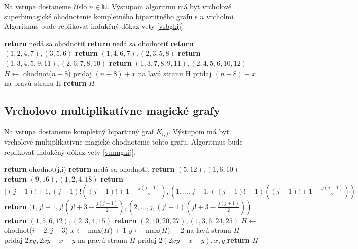 \begin{alg}
\label{algvsbgkij}
Na vstupe dostaneme číslo $n \in \mathbb{N}$. Výstupom algoritmu má byť vrcholové superbimagické ohodnotenie kompletného bipartitného grafu s $n$ vrcholmi. Algoritmus bude replikovať indukčný dôkaz vety \ref{vsbgkij}.
\end{alg}

\begin{algorithmic}
	\STATE \textbf{return} nedá sa ohodnotiť
\ENDIF
{}
	\STATE \textbf{return} nedá sa ohodnotiť
\ENDIF
{}
	\STATE \textbf{return} $(1, 2, 4, 7), (3, 5, 6)$
\ENDIF
{}
	\STATE \textbf{return} $(1, 4, 6, 7), (2, 3, 5, 8)$
\ENDIF
{}
	\STATE \textbf{return} $(1, 3, 4, 5, 9, 11), (2, 6, 7, 8, 10)$
\ENDIF
{}
	\STATE \textbf{return} $(1, 3, 7, 8, 9, 11), (2, 4, 5, 6, 10, 12)$
\ENDIF
\STATE $H \gets$ ohodnot($n - 8$)
		\STATE pridaj $(n-8)+x$ na ľavú stranu H
	\ELSE
		\STATE pridaj $(n-8)+x$ na pravú stranu H
	\ENDIF
\ENDFOR
\STATE \textbf{return} $H$
\end{algorithmic}

\subsection{Vrcholovo multiplikatívne magické grafy}

\begin{alg}
\label{algvmmgkij}
Na vstupe dostaneme kompletný bipartitný graf $K_{i,j}$. Výstupom má byť vrcholové multiplikatívne magické ohodnotenie tohto grafu. Algoritmus bude replikovať indukčný dôkaz vety \ref{vmmgkij}.
\end{alg}

\begin{algorithmic}
	\STATE \textbf{return} ohodnot(j,i)
\ENDIF
{}
	\STATE \textbf{return} nedá sa ohodnotiť
\ENDIF
{}
	\STATE \textbf{return} $(5, 12), (1, 6, 10)$
\ENDIF
{}
	\STATE \textbf{return} $(9, 16), (1, 2, 4, 18)$
\ENDIF
{}
	\STATE \textbf{return} $((j-1)! + 1, (j-1)! ((j-1)! + 1 - \frac{j(j-1)}{2}), (1, \dots , j-1, ((j-1)! + 1) ((j-1)! + 1 - \frac{j(j-1)}{2}))$
\ENDIF
{}
	\STATE \textbf{return} $(1, j! + 1, j! (j! + 3 - \frac{j(j+1)}{2}), (2, \dots , j, (j! + 1) (j! + 3 - \frac{j(j+1)}{2}))$
\ENDIF
{}
	\STATE \textbf{return} $(1, 5, 6, 12), (2, 3, 4, 15)$
\ENDIF
{}
	\STATE \textbf{return} $(2, 10, 20, 27), (1, 3, 6, 24, 25)$
\ENDIF
\STATE $H \gets$ ohodnot($i - 2, j - 3$)
\STATE $x \gets$ max($H$) + 1
\STATE $y \gets$ max($H$) + 2
\STATE na ľavú stranu $H$ pridaj $2xy, 2xy - x - y$
\STATE na pravú stranu $H$ pridaj $2(2xy - x - y), x, y$
\STATE \textbf{return} $H$
\end{algorithmic}

